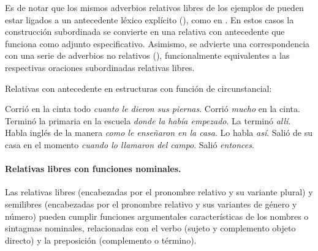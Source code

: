 Es de notar que los mismos adverbios relativos libres de los ejemplos de
 pueden estar ligados a un antecedente léxico explícito
(), como en . En estos
casos la construcción subordinada se convierte en una relativa con antecedente
que funciona como adjunto especificativo. Asimismo, se advierte una
correspondencia con una serie de adverbios no relativos (), funcionalmente equivalentes a las respectivas oraciones subordinadas
relativas libres.

\begin{exe}
  \ex\label{ex:13-circant} Relativas con antecedente en estructuras con función
      de circunstancial:
    \begin{xlist}
      \ex Corrió en la cinta todo \textit{cuanto le dieron sus piernas}. Corrió
          \textit{mucho} en la cinta.
      \ex Terminó la primaria en la escuela \textit{donde la había empezado}. La
          terminó \textit{allí}.
      \ex Habla inglés de la manera \textit{como le enseñaron en la casa}. Lo
          habla \textit{así}.
      \ex Salió de su casa en el momento \textit{cuando lo llamaron del campo}.
          Salió \textit{entonces}.
    \end{xlist}
\end{exe}

\paragraph{Relativas libres con funciones nominales.}\label{sec:13-libres-nom}
Las relativas libres (encabezadas por el pronombre relativo  y su
variante plural) y semilibres (encabezadas por el pronombre relativo  y sus variantes de género y número) pueden cumplir funciones argumentales
características de los nombres o sintagmas nominales, relacionadas con el verbo
(sujeto y complemento objeto directo) y la preposición (complemento o término).

